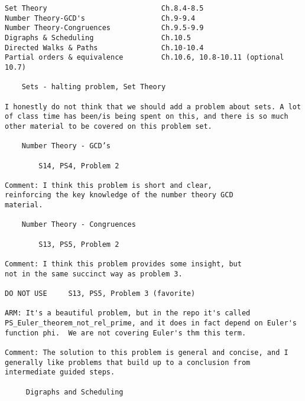 \documentclass[handout]{mcs}
\begin{document}
\renewcommand{\reading}{
\begin{itemize}
\item Chapter~\bref{number_theory_chap}.\ \emph{Number Theory} through
Section~\bref{sec:inverse}.
\item Chapter~\bref{digraphs_chap}.\ \emph{Digraphs}, (Section~\bref{poset-as-sets_sec} optional).
\end{itemize}}


\begin{staffnotes}
\begin{verbatim}
Set Theory                           Ch.8.4-8.5
Number Theory-GCD's                  Ch.9-9.4
Number Theory-Congruences            Ch.9.5-9.9
Digraphs & Scheduling                Ch.10.5
Directed Walks & Paths               Ch.10-10.4
Partial orders & equivalence         Ch.10.6, 10.8-10.11 (optional 10.7)

    Sets - halting problem, Set Theory

I honestly do not think that we should add a problem about sets. A lot
of class time has been/is being spent on this, and there is so much
other material to be covered on this problem set.

    Number Theory - GCD’s

        S14, PS4, Problem 2

Comment: I think this problem is short and clear,
reinforcing the key knowledge of the number theory GCD
material.

    Number Theory - Congruences

        S13, PS5, Problem 2

Comment: I think this problem provides some insight, but
not in the same succinct way as problem 3.

DO NOT USE     S13, PS5, Problem 3 (favorite)

ARM: It's a beautiful problem, but in the repo it's called
PS_Euler_theorem_not_rel_prime, and it does in fact depend on Euler's
function phi.  We are not covering Euler's thm this term.

Comment: The solution to this problem is general and concise, and I
generally like problems that build up to a conclusion from
intermediate guided steps.

     Digraphs and Scheduling


\end{verbatim}
\end{staffnotes}
\end{document}
